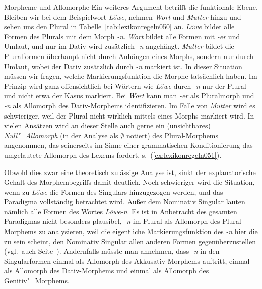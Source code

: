 \begin{Vertiefung}{Morpheme und Allomorphe}
Ein weiteres Argument betrifft die funktionale Ebene.
Bleiben wir bei dem Beispielwort \textit{Löwe}, nehmen \textit{Wort} und \textit{Mutter} hinzu und sehen uns den Plural in Tabelle~\ref{tab:lexikonregeln050} an.
\textit{Löwe} bildet alle Formen des Plurals mit dem Morph \textit{-n}.
\textit{Wort} bildet alle Formen mit \textit{-er} und Umlaut, und nur im Dativ wird zusätzlich \textit{-n} angehängt.
\textit{Mutter} bildet die Pluralformen überhaupt nicht durch Anhängen eines Morphs, sondern nur durch Umlaut, wobei der Dativ zusätzlich durch \textit{-n} markiert ist.
In dieser Situation müssen wir fragen, welche Markierungsfunktion die Morphe tatsächlich haben.
Im Prinzip wird ganz offensichtlich bei Wörtern wie \textit{Löwe} durch \textit{-n} nur der Plural und nicht etwa der Kasus markiert.
Bei \textit{Wort} kann man \textit{-er} als Pluralmorph und \textit{-n} als Allomorph des Dativ-Morphems identifizieren.
Im Falle von \textit{Mutter} wird es schwieriger, weil der Plural nicht wirklich mittels eines Morphs markiert wird.
In vielen Ansätzen wird an dieser Stelle auch gerne ein (unsichtbares) \textit{Null"=Allomorph} (in der Analyse \zB als $\emptyset$ notiert) des Plural-Morphems angenommen, das seinerseits im Sinne einer grammatischen Konditionierung das umgelautete Allomorph des Lexems fordert, s.\ (\ref{ex:lexikonregeln051}).

\begin{exe}
\end{exe}

Obwohl dies zwar eine theoretisch zulässige Analyse ist, sinkt der explanatorische Gehalt des Morphembegriffs damit deutlich.
Noch schwieriger wird die Situation, wenn zu \textit{Löwe} die Formen des Singulars hinzugezogen werden, und das Paradigma vollständig betrachtet wird.
Außer dem Nominativ Singular lauten nämlich alle Formen des Wortes \textit{Löwe-n}.
Es ist in Anbetracht des gesamten Paradigmas nicht besonders plausibel, \textit{-n} im Plural als Allomorph des Plural-Morphems zu analysieren, weil die eigentliche Markierungsfunktion des \textit{-n} hier die zu sein scheint, den Nominativ Singular allen anderen Formen gegenüberzustellen (vgl.\ auch Seite~\pageref{abs:morphe015}).
Andernfalls müsste man annehmen, dass \textit{-n} in den Singularformen einmal als Allomorph des Akkusativ-Morphems auftritt, einmal als Allomorph des Dativ-Morphems und einmal als Allomorph des Genitiv"=Morphems.



\end{Vertiefung}

